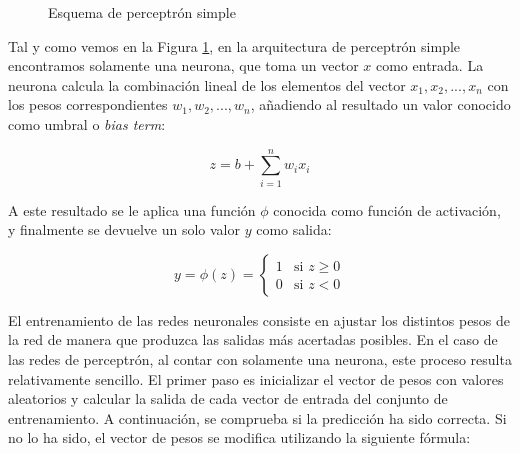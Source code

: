 \documentclass[11pt,spanish,listoffigures,listoftables]{tfgetsinf}
\begin{document}
\begin{figure}[h]
	\centering
	\caption{Esquema de perceptrón simple}
	\label{fig:perceptronSimple}	
\end{figure}


Tal y como vemos en la Figura \ref{fig:perceptronSimple}, en la arquitectura de perceptrón simple encontramos solamente una neurona, que toma un vector $x$ como entrada. La neurona calcula la combinación lineal de los elementos del vector $x_1, x_2, ..., x_n$ con los pesos correspondientes $w_1, w_2, ..., w_n$, añadiendo al resultado un valor conocido como umbral o \textit{bias term}:

 \begin{equation}
\label{form:calcularZ}
z = b + \sum_{i = 1}^n w_i x_i
\end{equation}

 A este resultado se le aplica una función $\phi$ conocida como función de activación, y finalmente se devuelve un solo valor $y$ como salida:

\begin{equation}
y = \phi(z) = 
\begin{cases}
	1 & \text{si } z \ge 0 \\
	0 & \text{si } z < 0
\end{cases}
\end{equation}

El entrenamiento de las redes neuronales consiste en ajustar los distintos pesos de la red de manera que produzca las salidas más acertadas posibles. En el caso de las redes de perceptrón, al contar con solamente una neurona, este proceso resulta relativamente sencillo. El primer paso es inicializar el vector de pesos con valores aleatorios y calcular la salida de cada vector de entrada del conjunto de entrenamiento. A continuación, se comprueba si la predicción ha sido correcta. Si no lo ha sido, el vector de pesos se modifica utilizando la siguiente fórmula:
\end{document}
